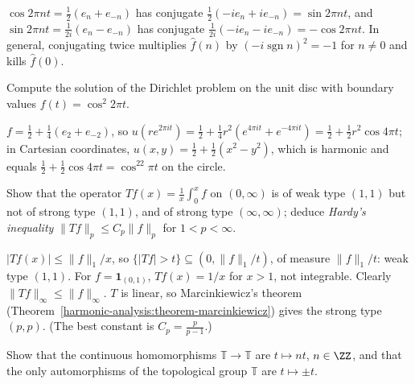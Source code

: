 \begin{solution}
$\cos 2\pi nt = \frac12(e_n + e_{-n})$ has conjugate $\frac12(-ie_n + ie_{-n}) = \sin 2\pi nt$, and $\sin 2\pi nt = \frac{1}{2i}(e_n - e_{-n})$ has conjugate $\frac{1}{2i}(-ie_n - ie_{-n}) = -\cos 2\pi nt$. In general,
conjugating twice multiplies $\hat f(n)$ by $(-i\operatorname{sgn}n)^2 = -1$ for $n \neq 0$ and kills $\hat f(0)$.
\end{solution}

\begin{exercise}\label{harmonic-analysis:exercise-poisson-harmonic}
Compute the solution of the Dirichlet problem on the unit disc with boundary values $f(t) = \cos^2 2\pi t$.
\end{exercise}

\begin{solution}
$f = \frac12 + \frac14(e_2 + e_{-2})$, so $u(re^{2\pi it}) = \frac12 + \frac14r^2(e^{4\pi it} + e^{-4\pi it}) = \frac12 + \frac12r^2\cos 4\pi t$; in Cartesian coordinates, $u(x, y) = \frac12 + \frac12(x^2 - y^2)$, which is
harmonic and equals $\frac12 + \frac12\cos 4\pi t = \cos^22\pi t$ on the circle.
\end{solution}

\begin{exercise}\label{harmonic-analysis:exercise-weak-not-strong}
Show that the operator $Tf(x) = \frac1x\int_0^xf$ on $(0, \infty)$ is of weak type $(1, 1)$ but not of strong type $(1, 1)$, and of strong type $(\infty, \infty)$; deduce \emph{Hardy's inequality}
$\|Tf\|_p \leq C_p\|f\|_p$ for $1 < p < \infty$.
\end{exercise}

\begin{solution}
$|Tf(x)| \leq \|f\|_1/x$, so $\{|Tf| > t\} \subseteq (0, \|f\|_1/t)$, of measure $\|f\|_1/t$: weak type $(1, 1)$. For $f = \mathbf{1}_{(0,1)}$, $Tf(x) = 1/x$ for $x > 1$, not integrable. Clearly $\|Tf\|_\infty \leq \|f\|_\infty$.
$T$ is linear, so Marcinkiewicz's theorem (Theorem~\ref{harmonic-analysis:theorem-marcinkiewicz}) gives the strong type $(p, p)$. (The best constant is $C_p = \frac{p}{p - 1}$.)
\end{solution}

\begin{exercise}\label{harmonic-analysis:exercise-circle-endomorphisms}
Show that the continuous homomorphisms $\mathbb{T} \to \mathbb{T}$ are $t \mapsto nt$, $n \in \ZZ$, and that the only automorphisms of the topological group $\mathbb{T}$ are $t \mapsto \pm t$.
\end{exercise}

